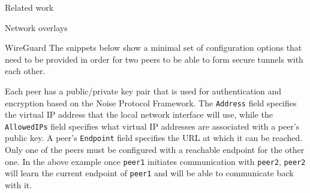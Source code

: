 \begin{frame}[fragile]{Related work}
\begin{block}{Network overlays}
\begin{block}{WireGuard}
The snippets below show a minimal set of configuration options that need
to be provided in order for two peers to be able to form secure tunnels
with each other.

\begin{Shaded}
\begin{Highlighting}[]
\KeywordTok{[Interface]}
\OtherTok{=}
\OtherTok{=}\StringTok{ }
\OtherTok{=}

\KeywordTok{[Peer]}
\OtherTok{=}
\OtherTok{=}
\OtherTok{=}
\end{Highlighting}
\end{Shaded}

\begin{Shaded}
\begin{Highlighting}[]
\KeywordTok{[Interface]}
\OtherTok{=}
\OtherTok{=}\StringTok{ }
\OtherTok{=}

\KeywordTok{[Peer]}
\OtherTok{=}
\OtherTok{=}
\end{Highlighting}
\end{Shaded}

Each peer has a public/private key pair that is used for authentication
and encryption based on the Noise Protocol
Framework\autocite{noiseDocs}. The \texttt{Address} field specifies the
virtual IP address that the local network interface will use, while the
\texttt{AllowedIPs} field specifies what virtual IP addresses are
associated with a peer's public key. A peer's \texttt{Endpoint} field
specifies the URL at which it can be reached. Only one of the peers must
be configured with a reachable endpoint for the other one. In the above
example once \texttt{peer1} initiates communication with \texttt{peer2},
\texttt{peer2} will learn the current endpoint of \texttt{peer1} and
will be able to communicate back with it.
\end{block}


\end{block}
\end{frame}

